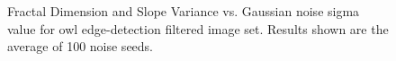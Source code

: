 \documentclass[12pt, oneside]{book}
\begin{document}
\begin{figure}[!b]
  \centering
  \caption[Fractal Dimension and Slope Variance vs. Gaussian noise sigma value for owl edge-detection filtered image set.]{Fractal Dimension and Slope Variance vs. Gaussian noise sigma value for owl edge-detection filtered image set.  Results shown are the average of 100 noise seeds.}
  \label{fig:owl-ed_gaussian_multi_result}
\end{figure}
\end{document}
